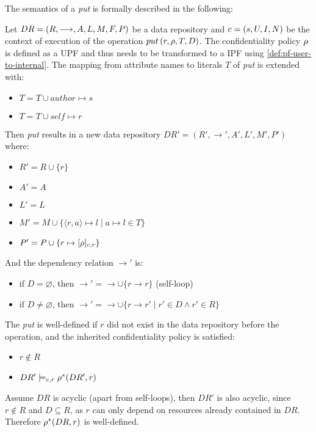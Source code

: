 The semantics of a \emph{put} is formally described in the following:
\begin{definition}
Let $DR= \left( R, \longrightarrow, A, L, M, F, P \right)$ be a data repository and $c = \left( s, U, I, N \right)$ be the context of execution of the operation $put \left( r, \rho, T, D \right)$. The confidentiality policy $\rho$ is defined as a UPF and thus needs to be transformed to a IPF using \autoref{def:pf-user-to-internal}. The mapping from attribute names to literals $T$ of \emph{put} is extended with: 
\begin{itemize}
    \item $T = T \cup author \mapsto s$
    \item $T = T \cup self \mapsto r$
\end{itemize}
Then \emph{put} results in a new data repository $DR'=\left(R', \longrightarrow', A', L', M', P' \right)$ where:
\begin{itemize}
    \item $R' = R \cup \{r\}$
    \item $A' = A$
    \item $L' = L$
    \item $M' = M \cup \{ \langle r,a \rangle \mapsto l \mid a \mapsto l \in T \}$
    \item $P' = P \cup \{ r \mapsto [\rho]_{c,r} \}$
\end{itemize}
And the dependency relation $\longrightarrow'$ is:
\begin{itemize}
    \item if $D = \varnothing$, then $\longrightarrow' = \longrightarrow \cup \{r \longrightarrow r\}$ (self-loop)
    \item if $D \neq \varnothing$, then $\longrightarrow' = \longrightarrow \cup \{r \longrightarrow r' \mid r' \in D \land r' \in R \}$
\end{itemize}
The \emph{put} is well-defined if $r$ did not exist in the data repository before the operation, and the inherited confidentiality policy is satisfied:
\begin{itemize}
    \item $r \not\in R$
    \item $DR' \models_{c,r} \rho^{\ast}(DR',r)$
\end{itemize}
Assume $DR$ is acyclic (apart from self-loops), then $DR'$ is also acyclic, since $r \notin R$ and $D \subseteq R$, as $r$ can only depend on resources already contained in $DR$. Therefore $\rho^{\ast}(DR,r)$ is well-defined.
\end{definition}

